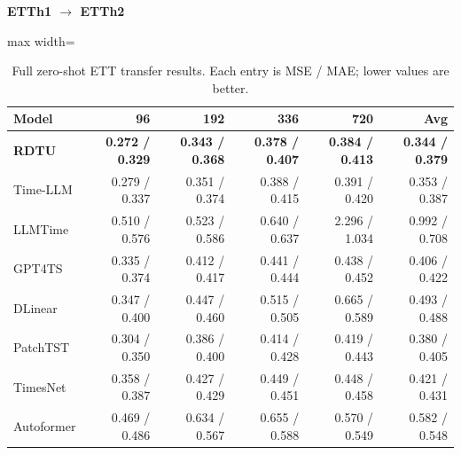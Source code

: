 \begin{table}[H]\centering\small
\caption{Full zero-shot ETT transfer results. Each entry is MSE / MAE; lower values are better.}\label{tab:zero-shot-forecasting}
\textbf{ETTh1 $\to$ ETTh2}\par\smallskip
\begin{adjustbox}{max width=\linewidth}\begin{tabular}{lrrrrr}\toprule
\textbf{Model} & \textbf{96} & \textbf{192} & \textbf{336} & \textbf{720} & \textbf{Avg}\\\midrule
\rowcolor{blue!5}
\textbf{RDTU} & \textbf{0.272 / 0.329} & \textbf{0.343 / 0.368} & \textbf{0.378 / 0.407} & \textbf{0.384 / 0.413} & \textbf{0.344 / 0.379}\\
Time-LLM & 0.279 / 0.337 & 0.351 / 0.374 & 0.388 / 0.415 & 0.391 / 0.420 & 0.353 / 0.387\\
LLMTime & 0.510 / 0.576 & 0.523 / 0.586 & 0.640 / 0.637 & 2.296 / 1.034 & 0.992 / 0.708\\
GPT4TS & 0.335 / 0.374 & 0.412 / 0.417 & 0.441 / 0.444 & 0.438 / 0.452 & 0.406 / 0.422\\
DLinear & 0.347 / 0.400 & 0.447 / 0.460 & 0.515 / 0.505 & 0.665 / 0.589 & 0.493 / 0.488\\
PatchTST & 0.304 / 0.350 & 0.386 / 0.400 & 0.414 / 0.428 & 0.419 / 0.443 & 0.380 / 0.405\\
TimesNet & 0.358 / 0.387 & 0.427 / 0.429 & 0.449 / 0.451 & 0.448 / 0.458 & 0.421 / 0.431\\
Autoformer & 0.469 / 0.486 & 0.634 / 0.567 & 0.655 / 0.588 & 0.570 / 0.549 & 0.582 / 0.548\\
\bottomrule\end{tabular}\end{adjustbox}\end{table}
